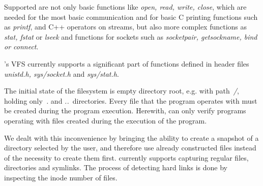 Supported are not only basic functions like \textit{open, read, write, close}, which are needed for the most basic communication and for basic C printing functions such as \textit{printf}, and C++ operators on streams, but also more complex functions as \textit{stat, fstat} or  \textit{lseek} and functions for sockets such as \textit{socketpair, getsockname, bind or connect}.

\divine's VFS currently supports a significant part of functions defined in header files \textit{unistd.h, sys/socket.h} and \textit{sys/stat.h}.

The initial state of the filesystem is empty directory root, e.g. with path~\textit{/}, holding only~\textit{.} and \textit{..}~directories. Every file that the program operates with must be created during the program execution. Herewith, \divine can only verify programs operating with files created during the execution of the program. 

We dealt with this inconvenience by bringing the ability to create a snapshot of a directory selected by the user, and therefore use already constructed files instead of the necessity to create them first. \divine currently supports capturing regular files, directories and symlinks. The process of detecting hard links is done by inspecting the inode number of files.